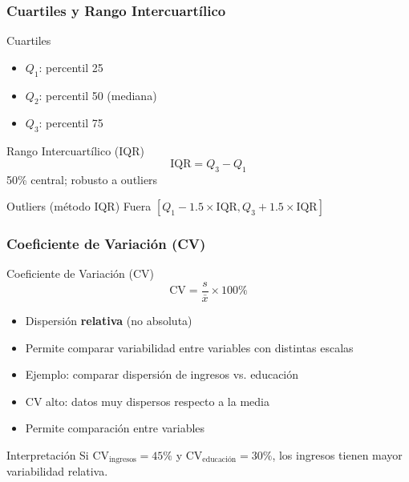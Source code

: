 \documentclass[aspectratio=169,11pt]{beamer}
\begin{document}
\begin{frame}[fragile]
\frametitle{Cuartiles y Rango Intercuartílico}
\small

\begin{block}{Cuartiles}
  \begin{itemize}
    \item $Q_1$: percentil 25
    \item $Q_2$: percentil 50 (mediana)
    \item $Q_3$: percentil 75
  \end{itemize}
\end{block}

\begin{block}{Rango Intercuartílico (IQR)}
  $$\text{IQR} = Q_3 - Q_1$$
  50\% central; robusto a outliers
\end{block}

\pause

\begin{alertblock}{Outliers (método IQR)}
  Fuera $[Q_1 - 1.5 \times \text{IQR}, Q_3 + 1.5 \times \text{IQR}]$
\end{alertblock}
\end{frame}

\begin{frame}[fragile]
\frametitle{Coeficiente de Variación (CV)}

\begin{block}{Coeficiente de Variación (CV)}
  $$\text{CV} = \frac{s}{\bar{x}} \times 100\%$$

  \begin{itemize}
    \item Dispersión \textbf{relativa} (no absoluta)
    \item Permite comparar variabilidad entre variables con distintas escalas
    \item Ejemplo: comparar dispersión de ingresos vs. educación
    \item CV alto: datos muy dispersos respecto a la media
    \item Permite comparación entre variables
  \end{itemize}
\end{block}

\pause

\begin{exampleblock}{Interpretación}
  Si CV$_{\text{ingresos}} = 45\%$ y CV$_{\text{educación}} = 30\%$, los ingresos tienen mayor variabilidad relativa.
\end{exampleblock}
\end{frame}
\end{document}
